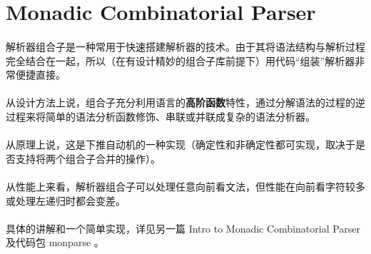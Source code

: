 \documentclass{article}
\begin{document}
	\section{ Monadic Combinatorial Parser }
	\paragraph{}
	解析器组合子\cite{Hutton96monadicparser}是一种常用于快速搭建解析器的技术。由于其将语法结构与解析过程完全结合在一起，所以（在有设计精妙的组合子库\cite{parsec}前提下）用代码“组装”解析器非常便捷直接。
	\paragraph{}
	从设计方法上说，组合子充分利用语言的\textbf{高阶函数}特性，通过分解语法的过程的逆过程来将简单的语法分析函数修饰、串联或并联成复杂的语法分析器。
	\paragraph{}
	从原理上说，这是下推自动机的一种实现（确定性和非确定性都可实现，取决于是否支持将两个组合子合并的操作）。
	\paragraph{}
	从性能上来看，解析器组合子可以处理任意向前看文法，但性能在向前看字符较多或处理左递归时都会变差\cite{Frost07parsercombinators}。
	\paragraph{}
	具体的讲解和一个简单实现，详见另一篇 Intro to Monadic Combinatorial Parser 及代码包 monparse 。
 	
 	\medskip
	
	
\end{document}
